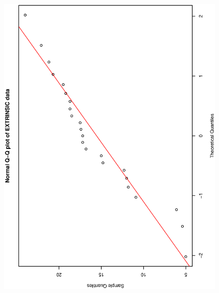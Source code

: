 \documentclass[a4paper,10pt]{article}
\begin{document}
\begin{figure}
\includegraphics[angle=-90, width=1\textwidth]{figures/math650_hw4_extrinsic_qqnorm.eps}
\caption{}\label{f2}
\end{figure}
\end{document}
